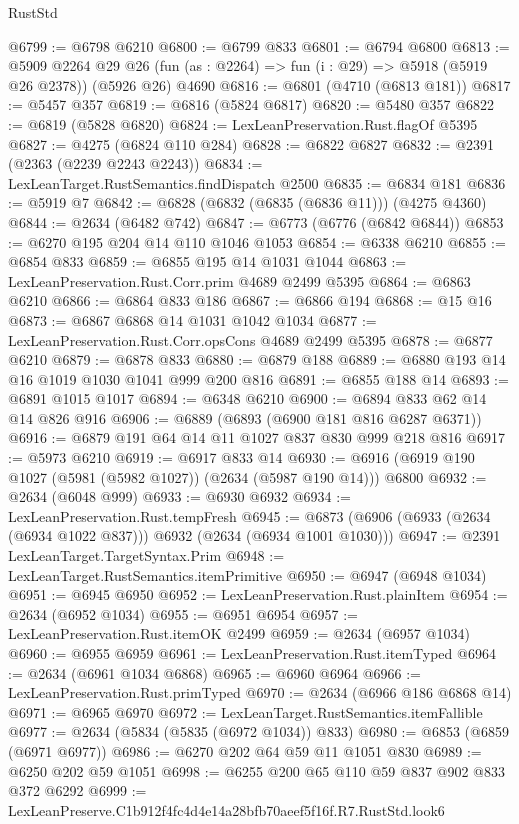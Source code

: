 \begin{lexlean}{RustStd}
\begin{coremodule}
@6799 := @6798 @6210
@6800 := @6799 @833
@6801 := @6794 @6800
@6813 := @5909
    @2264
    @29
    @26
    (fun (as : @2264) => fun (i : @29) => @5918 (@5919 @26 @2378))
    (@5926 @26)
    @4690
@6816 := @6801 (@4710 (@6813 @181))
@6817 := @5457 @357
@6819 := @6816 (@5824 @6817)
@6820 := @5480 @357
@6822 := @6819 (@5828 @6820)
@6824 := LexLeanPreservation.Rust.flagOf @5395
@6827 := @4275 (@6824 @110 @284)
@6828 := @6822 @6827
@6832 := @2391 (@2363 (@2239 @2243 @2243))
@6834 := LexLeanTarget.RustSemantics.findDispatch @2500
@6835 := @6834 @181
@6836 := @5919 @7
@6842 := @6828 (@6832 (@6835 (@6836 @11))) (@4275 @4360)
@6844 := @2634 (@6482 @742)
@6847 := @6773 (@6776 (@6842 @6844))
@6853 := @6270 @195 @204 @14 @110 @1046 @1053
@6854 := @6338 @6210
@6855 := @6854 @833
@6859 := @6855 @195 @14 @1031 @1044
@6863 := LexLeanPreservation.Rust.Corr.prim @4689 @2499 @5395
@6864 := @6863 @6210
@6866 := @6864 @833 @186
@6867 := @6866 @194
@6868 := @15 @16
@6873 := @6867 @6868 @14 @1031 @1042 @1034
@6877 := LexLeanPreservation.Rust.Corr.opsCons @4689 @2499 @5395
@6878 := @6877 @6210
@6879 := @6878 @833
@6880 := @6879 @188
@6889 := @6880 @193 @14 @16 @1019 @1030 @1041 @999 @200 @816
@6891 := @6855 @188 @14
@6893 := @6891 @1015 @1017
@6894 := @6348 @6210
@6900 := @6894 @833 @62 @14 @14 @826 @916
@6906 := @6889 (@6893 (@6900 @181 @816 @6287 @6371))
@6916 := @6879 @191 @64 @14 @11 @1027 @837 @830 @999 @218 @816
@6917 := @5973 @6210
@6919 := @6917 @833 @14
@6930 := @6916 (@6919 @190 @1027 (@5981 (@5982 @1027)) (@2634 (@5987 @190 @14))) @6800
@6932 := @2634 (@6048 @999)
@6933 := @6930 @6932
@6934 := LexLeanPreservation.Rust.tempFresh
@6945 := @6873 (@6906 (@6933 (@2634 (@6934 @1022 @837))) @6932 (@2634 (@6934 @1001 @1030)))
@6947 := @2391 LexLeanTarget.TargetSyntax.Prim
@6948 := LexLeanTarget.RustSemantics.itemPrimitive
@6950 := @6947 (@6948 @1034)
@6951 := @6945 @6950
@6952 := LexLeanPreservation.Rust.plainItem
@6954 := @2634 (@6952 @1034)
@6955 := @6951 @6954
@6957 := LexLeanPreservation.Rust.itemOK @2499
@6959 := @2634 (@6957 @1034)
@6960 := @6955 @6959
@6961 := LexLeanPreservation.Rust.itemTyped
@6964 := @2634 (@6961 @1034 @6868)
@6965 := @6960 @6964
@6966 := LexLeanPreservation.Rust.primTyped
@6970 := @2634 (@6966 @186 @6868 @14)
@6971 := @6965 @6970
@6972 := LexLeanTarget.RustSemantics.itemFallible
@6977 := @2634 (@5834 (@5835 (@6972 @1034)) @833)
@6980 := @6853 (@6859 (@6971 @6977))
@6986 := @6270 @202 @64 @59 @11 @1051 @830
@6989 := @6250 @202 @59 @1051
@6998 := @6255 @200 @65 @110 @59 @837 @902 @833 @372 @6292
@6999 := LexLeanPreserve.C1b912f4fc4d4e14a28bfb70aeef5f16f.R7.RustStd.look6

\end{coremodule}
\end{lexlean}
